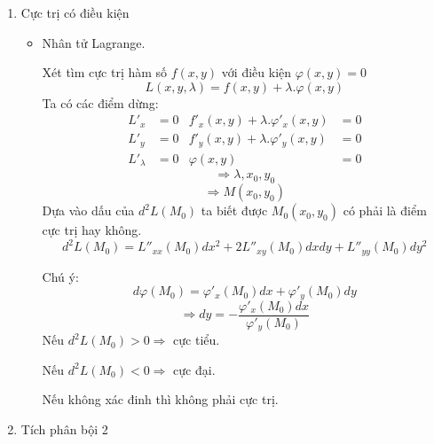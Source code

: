 \documentclass[15pt,a4paper]{report}
\begin{document}
{\begin{center}
\begin{enumerate}
\begin{itemize}
                    Ta xét:
                        \[A = f''_{xx}(x_{0}, y_{0})\]
                        \[B = f''_{xy}(x_{0}, y_{0})\]
                        \[C = f''_{yy}(x_{0}, y_{0})\]
                    \indent Để $M_{0}$ là điểm cực trị của hàm số:
                        \[AC - B^{2} > 0\]
                    Nếu $A > 0$ hoặc $C > 0$ $\Rightarrow$ cực tiểu địa phương.

                    Nếu $A < 0$ hoặc $C < 0$ $\Rightarrow$ cực đại địa phương.
                    
                    Nếu $AC - B^{2} < 0$ $\Rightarrow$ không phải cực trị.

                    Nếu $AC - B^{2} = 0$ $\Rightarrow$ cũng có thể là có, cũng có thể là không.
            
            \end{itemize}
                
        \item Cực trị có điều kiện
            \begin{itemize}
                \item Nhân tử  Lagrange.
                    
                Xét tìm cực trị hàm số $f(x, y)$ với điều kiện $\varphi(x, y) = 0$
                \[L(x, y, \lambda) = f(x, y) + \lambda . \varphi(x, y)\]
                Ta có các điểm dừng:
                \begin{align*}
                L'_{x} &= 0 & f'_{x}(x, y) + \lambda.\varphi'_{x}(x, y) &= 0\\
                L'_{y} &= 0 & f'_{y}(x, y) + \lambda.\varphi'_{y}(x, y) &= 0 \\
                L'_{\lambda} & = 0 & \varphi(x, y) &= 0
            \end{align*}
                \[\Rightarrow \lambda, x_{0}, y_{0}\]
                \[\Rightarrow M(x_{0}, y_{0})\]
                Dựa vào dấu của $d^{2}L(M_{0})$ ta biết được $M_{0}(x_{0}, y_{0})$ có phải là điểm cực trị hay không.
                \[d^{2}L(M_{0}) = L''_{xx}(M_{0})dx^{2} + 2L''_{xy}(M_{0})dxdy + L''_{yy}(M_{0})dy^{2}\]

                Chú ý:
                \[d\varphi(M_{0}) = \varphi'_{x}(M_{0}) dx + \varphi'_{y}(M_{0}) dy\]
                \[\Rightarrow dy = -\dfrac{\varphi'_{x}(M_{0})dx}{\varphi'_{y}(M_{0})}\]
                Nếu $d^{2}L(M_{0}) > 0 \Rightarrow$ cực tiểu.
                
                Nếu $d^{2}L(M_{0}) < 0 \Rightarrow$ cực đại.
                
                Nếu không xác đinh thì không phải cực trị.
            \end{itemize}
        \item Tích phân bội 2
        
            
    \end{enumerate}
    
\end{center}




}
\end{document}
